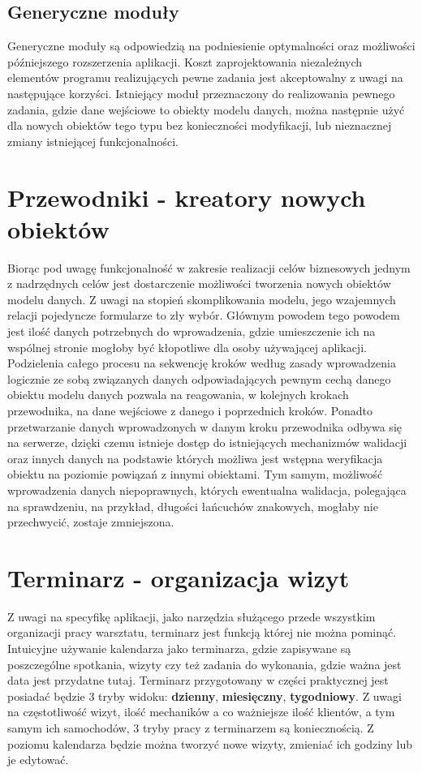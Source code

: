 	\subsection{Generyczne moduły}
		Generyczne moduły są odpowiedzią na podniesienie optymalności oraz możliwości późniejszego rozszerzenia aplikacji. Koszt zaprojektowania niezależnych elementów programu realizujących pewne zadania jest akceptowalny z uwagi na następujące korzyści. Istniejący moduł przeznaczony do realizowania pewnego zadania, gdzie dane wejściowe to obiekty modelu danych, można następnie użyć dla nowych obiektów tego typu bez konieczności modyfikacji, lub nieznacznej zmiany istniejącej funkcjonalności. 
	\section{Przewodniki - kreatory nowych obiektów}
		Biorąc pod uwagę funkcjonalność w zakresie realizacji celów biznesowych jednym z nadrzędnych celów jest dostarczenie możliwości tworzenia nowych obiektów modelu danych. Z uwagi na stopień skomplikowania modelu, jego wzajemnych relacji pojedyncze formularze to zły wybór. Głównym powodem tego powodem jest ilość danych potrzebnych do wprowadzenia, gdzie umieszczenie ich na wspólnej stronie mogłoby być kłopotliwe dla osoby używającej aplikacji. Podzielenia całego procesu na sekwencję kroków według zasady wprowadzenia logicznie ze sobą związanych danych odpowiadających pewnym cechą danego obiektu modelu danych pozwala na reagowania, w kolejnych krokach przewodnika, na dane wejściowe z danego i poprzednich kroków. Ponadto przetwarzanie danych wprowadzonych w danym kroku przewodnika odbywa się na serwerze, dzięki czemu istnieje dostęp do istniejących mechanizmów walidacji oraz innych danych na podstawie których możliwa jest wstępna weryfikacja obiektu na poziomie powiązań z innymi obiektami. Tym samym, możliwość wprowadzenia danych niepoprawnych, których ewentualna walidacja, polegająca na sprawdzeniu, na przykład, długości łańcuchów znakowych, mogłaby nie przechwycić, zostaje zmniejszona.
	\section{Terminarz - organizacja wizyt}
		Z uwagi na specyfikę aplikacji, jako narzędzia służącego przede wszystkim organizacji pracy warsztatu, terminarz jest funkcją której nie można pominąć. Intuicyjne używanie kalendarza jako terminarza, gdzie zapisywane są poszczególne spotkania, wizyty czy też zadania do wykonania, gdzie ważna jest data jest przydatne tutaj. Terminarz przygotowany w części praktycznej jest posiadać będzie 3 tryby widoku: \textbf{dzienny}, \textbf{miesięczny}, \textbf{tygodniowy}. Z uwagi na częstotliwość wizyt, ilość mechaników a co ważniejsze ilość klientów, a tym samym ich samochodów, 3 tryby pracy z terminarzem są koniecznością. Z poziomu kalendarza będzie można tworzyć nowe wizyty, zmieniać ich godziny lub je edytować. 
